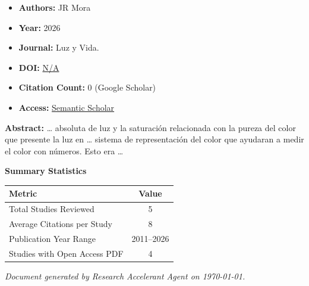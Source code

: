 \documentclass[11pt,a4paper]{article}
\begin{document}
\begin{resultbox}
\begin{itemize}[leftmargin=*]
    \item \textbf{Authors:} JR Mora
    \item \textbf{Year:} 2026
    \item \textbf{Journal:} Luz y Vida.
    
    
    
    \item \textbf{DOI:} \href{https://doi.org/}{N/A}
    \item \textbf{Citation Count:} 0 (Google Scholar)
    \item \textbf{Access:} \href{https://www.rasc.es/wp-content/uploads/2025/01/Luz-y-Vida_Conmemorando-el-dia-internacional-de-la-luz.pdf#page=89}{Semantic Scholar}
\end{itemize}
\end{resultbox}

\textbf{Abstract:} … absoluta de luz y la saturación relacionada con la pureza del color que presente la luz en … sistema de representación del color que ayudaran a medir el color con números. Esto era …\par\vspace{0.5em}



\vspace{1em}
\textbf{\large Summary Statistics}\par\vspace{0.5em}

\begin{center}
\begin{tabular}{lc}
\toprule
\textbf{Metric} & \textbf{Value} \\
\midrule
Total Studies Reviewed & 5 \\
Average Citations per Study & 8 \\
Publication Year Range & 2011--2026 \\
Studies with Open Access PDF & 4 \\
\bottomrule
\end{tabular}
\end{center}


\vfill
\begin{center}
\textit{Document generated by Research Accelerant Agent on \today.}
\end{center}
\end{document}
